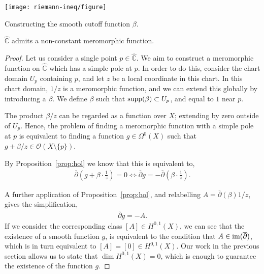 \begin{marginfigure}[-2\baselineskip]
	\centering
	\texttt{[image: riemann-ineq/figure]}
	\caption{Constructing the smooth cutoff function $ \beta $.}
\end{marginfigure}

\begin{lemma}\label{lem:riemann-existence}
	$ \hat{\mathbb{C}} $ admits a non-constant meromorphic function.
	\begin{proof}
		Let us consider a single point $ p \in \hat{\mathbb{C}} $. We aim to
		construct a meromorphic function on $ \hat{\mathbb{C}} $ which has a simple
		pole at $ p $. In order to do this, consider the chart domain $ U_p $
		containing $ p $, and let $ z $ be a local coordinate in this chart. In this
		chart domain, $ 1/z $ is a meromorphic function, and we can extend this
		globally by introducing a  $ \beta $. We define $
			\beta $ such that $ \operatorname{supp} ( \beta )\subset U_p $, and equal to $ 1 $ near $
			p$.

		The product $ \beta/z $ can be regarded as a function over $ X $; extending
		by zero outside of $ U_p $. Hence, the problem of finding a meromorphic
		function with a simple pole at $ p $ is equivalent to finding a function $ g
			\in \Omega^0(X) $ such that $ g+\beta/z \in \mathcal{O}( X \setminus \{ p \}
			) $.

		By Proposition~\ref{prop:hol} we know that this is equivalent to,
		\begin{align*}
			\overline{\partial }\left( g + \beta \cdot \frac{1}{z} \right)=0 \iff
			\overline{\partial }g = - \overline{\partial }\left( \beta \cdot \frac{1}{z}
			\right).
		\end{align*}

		A further application of Proposition~\ref{prop:hol}, and relabelling $ A =
			\overline{\partial }( \beta )1/z $, gives the simplification,
		\begin{align*}
			\overline{\partial }g = -A.
		\end{align*}
		If we consider the corresponding class $ [ A ]\in H ^{0,1}(X) $, we can see
		that the existence of a smooth function $ g $, is equivalent to the
		condition that $ A \in \operatorname{im} ( \overline{\partial } ) $, which is in turn
		equivalent to $ [ A ] = [ 0 ]\in H ^{0,1}(X) $. Our work in the previous
		section allows us to state that $ \dim H ^{0,1}(X)=0 $, which is enough to
		guarantee the existence of the function $ g $.
	\end{proof}
\end{lemma}

